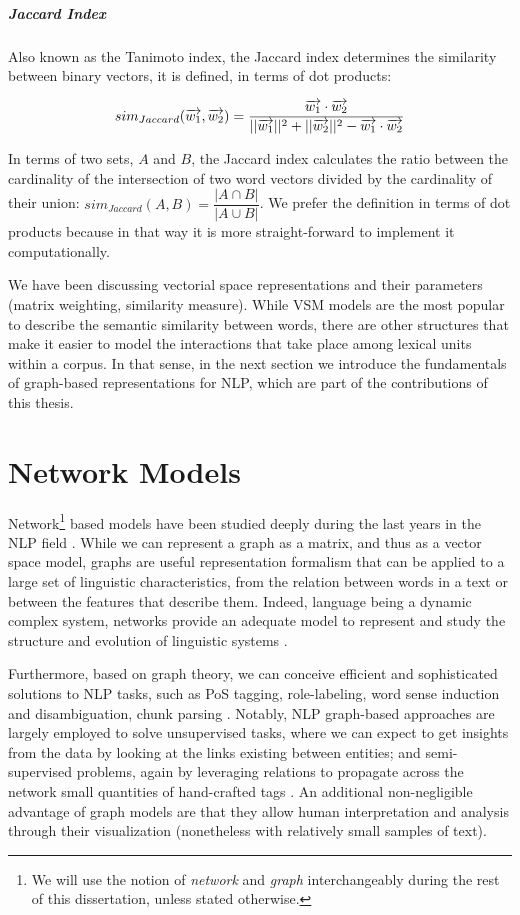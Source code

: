 \subparagraph{Jaccard Index}
Also known as the Tanimoto index, the Jaccard index \cite{jaccard1908nouvelles} determines the similarity between binary vectors, it is defined, in terms of dot products:

\begin{equation}
sim_{Jaccard}(\overrightarrow{w_1},\overrightarrow{w_2}) = \dfrac{\overrightarrow{w_1} \cdot \overrightarrow{w_2}}{||\overrightarrow{w_1}||^2+||\overrightarrow{w_2}||^2 - \overrightarrow{w_1}\cdot\overrightarrow{w_2}}
\vspace{1cm}
\end{equation}

In terms of two sets, $A$ and $B$, the Jaccard index  calculates the ratio between the cardinality of the intersection of two word vectors divided by the cardinality of their union: $sim_{	Jaccard}(A,B)=\dfrac{|A \cap B|}{|A \cup B|}$. We prefer the definition in terms of dot products because in that way it is more straight-forward to implement it computationally.

We have been discussing vectorial space representations and their parameters (matrix weighting, similarity measure). While VSM models are the most popular to describe the semantic similarity between words, there are other structures that make it easier to  model the interactions that take place among lexical units within a corpus. In that sense, in the next section we introduce the fundamentals of graph-based representations for NLP, which are part of the contributions of this thesis.


\section{Network Models}
Network\footnote{We will use the notion of \textit{network} and \textit{graph} interchangeably during the rest of this dissertation, unless stated otherwise.} based models have been studied deeply during the last years in the NLP field  \cite{Mihalcea2011}. While we can represent a graph as a matrix, and thus as a vector space model, graphs are useful representation formalism that can be applied to a large set of linguistic characteristics, from the relation between words in a text or between the features that describe them. Indeed, language being a dynamic complex system, networks provide an adequate model to represent and study the structure and evolution of linguistic systems \cite{Choudhury2009}. 

Furthermore, based on graph theory, we can conceive efficient and sophisticated solutions to NLP tasks, such as PoS tagging, role-labeling, word sense induction and disambiguation, chunk parsing \cite{Mihalcea2011}. Notably, NLP graph-based approaches are largely employed to solve unsupervised tasks, where we can expect to get insights from the data by looking at  the links existing between entities; and semi-supervised problems, again by leveraging relations to propagate across the network small quantities of hand-crafted tags \cite{nastase2015}. An additional non-negligible advantage of graph models are that they allow human interpretation and analysis through their visualization (nonetheless with relatively small samples of text). 


